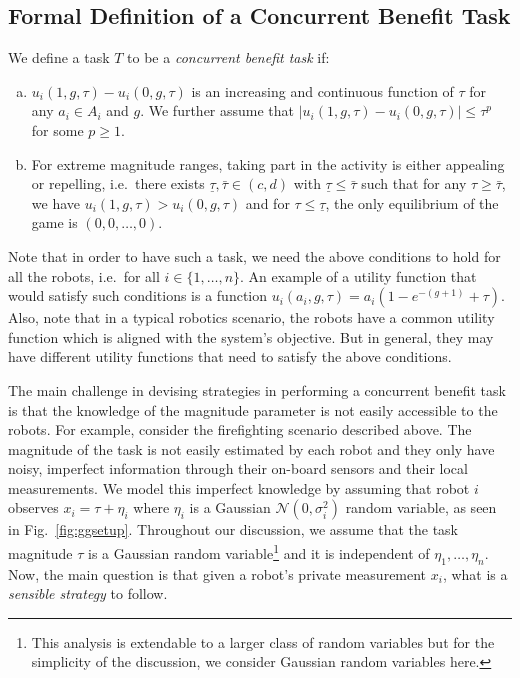 \documentclass[conference]{ieeeconf}
\begin{document}
\subsection{Formal Definition of a Concurrent Benefit Task}
We define a task $T$ to be a \textit{concurrent benefit task} if: 
\begin{enumerate}[a.]
	\item $u_i(1,g,\tau)-u_i(0,g,\tau)$ is an increasing and continuous function of $\tau$ for any $a_i\in A_i$ and $g$. We further assume that $|u_i(1,g,\tau)-u_i(0,g,\tau)|\leq \tau^p$ for some $p\geq 1$. 
	\item For extreme magnitude ranges, taking part in the activity is either appealing or repelling, i.e.\ there exists $\underline{\tau},\bar{\tau}\in (c,d)$ with $\underline{\tau}\leq \bar{\tau}$ such that for any $\tau\geq \bar{\tau}$, we have $u_i(1,g,\tau)>u_i(0,g,\tau)$ and for $\tau\leq \underline{\tau}$, the only equilibrium of the game is $(0,0,\ldots,0)$. 
\end{enumerate}

Note that in order to have such a task, we need the above conditions to hold for all the robots, i.e.\ for all $i\in\{1,\ldots,n\}$.
An example of a utility function that would satisfy such conditions is a function $u_i(a_i,g,\tau)=a_i(1-e^{-(g+1)}+\tau)$. Also, note that in a typical robotics scenario, the robots have a common utility function which is aligned with the system's objective. But in general, they may have different utility functions that need to satisfy the above conditions. 

The main challenge in devising strategies in performing a concurrent benefit task is that the knowledge of the magnitude parameter is not easily accessible to the robots. For example, consider the firefighting scenario described above. The magnitude of the task is not easily estimated by each robot and they only have noisy, imperfect information through their on-board sensors and their local measurements.  We model this imperfect knowledge by assuming that robot $i$ observes $x_i=\tau+\eta_i$ where $\eta_i$ is a Gaussian $\mathcal{N}(0,\sigma_i^2)$ random variable, as seen in Fig.~\ref{fig:ggsetup}. Throughout our discussion, we assume that the task magnitude $\tau$ is a Gaussian random variable\footnote{This analysis is extendable to a larger class of random variables but for the simplicity of the discussion, we consider Gaussian random variables here.} and it is independent of $\eta_1,\ldots,\eta_n$. Now, the main question is that given a robot's private measurement $x_i$, what is a \textit{sensible strategy} to follow. 
\end{document}
